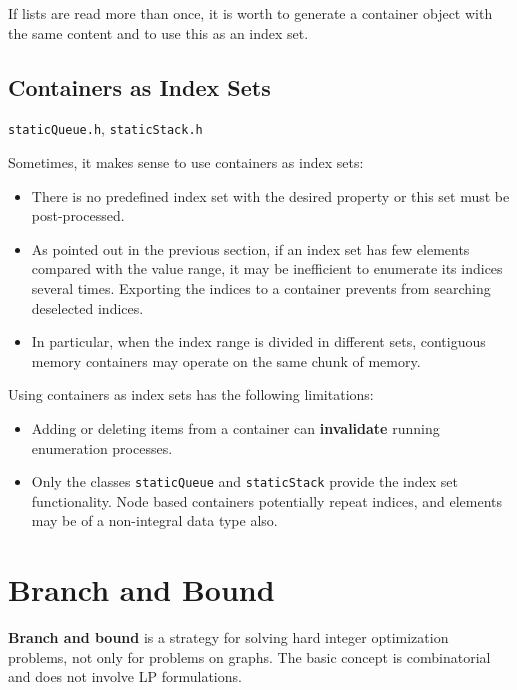 \documentclass[a4paper,11pt,twoside]{book}
\begin{document}
\begin{multicols}{2}
If lists are read more than once, it is worth to generate a container object
with the same content and to use this as an index set.


\section{Containers as Index Sets}
\myinclude\verb/staticQueue.h/, \verb/staticStack.h/

\medskip
\noindent
Sometimes, it makes sense to use containers as index sets:
\begin{itemize}
\item There is no predefined index set with the desired property or this set
    must be post-processed.
\item As pointed out in the previous section, if an index set has few elements
    compared with the value range, it may be inefficient to enumerate its
    indices several times. Exporting the indices to a container prevents from
    searching deselected indices.
\item In particular, when the index range is divided in different sets,
    contiguous memory containers may operate on the same chunk of memory.
\end{itemize}
Using containers as index sets has the following limitations:
\begin{itemize}
\item Adding or deleting items from a container can
    {\bf invalidate} running enumeration
    processes.
\item Only the classes \verb/staticQueue/ and \verb/staticStack/ provide the
    index set functionality. Node based containers potentially repeat indices,
    and elements may be of a non-integral data type also.
\end{itemize}



\cleardoublepage
{}
\chapter{Branch and Bound}
\thispagestyle{fancy}
\label{clb_bb}

{\bf Branch and bound} is a strategy for solving hard
integer optimization problems, not only for problems on graphs. The basic
concept is combinatorial and does not involve LP formulations.


\end{multicols}
\end{document}
